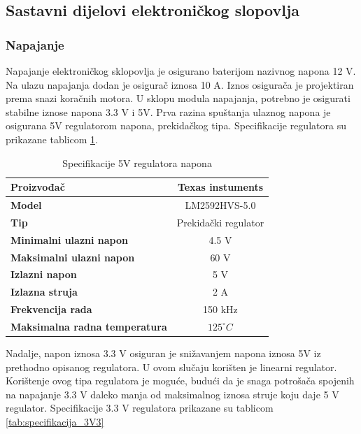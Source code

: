 \documentclass[11pt,a4paper]{article}
\begin{document}
\subsection{Sastavni dijelovi elektroničkog slopovlja}

\subsubsection{Napajanje}
Napajanje elektroničkog sklopovlja je osigurano baterijom nazivnog napona 12 V. Na ulazu napajanja dodan je osigurač iznosa 10 A. Iznos osigurača je projektiran prema snazi koračnih motora. U sklopu modula napajanja, potrebno je osigurati stabilne iznose napona 3.3 V i 5V. Prva razina spuštanja ulaznog napona je osigurana 5V regulatorom napona, prekidačkog tipa. Specifikacije regulatora su prikazane tablicom \ref{tab:specifikacija_5V}.


\begin{table}[H]
	\centering
	\caption{Specifikacije 5V regulatora napona}
	\label{tab:specifikacija_5V}
	\begin{tabular}{|l|c|}
		\hline
		\textbf{Proizvođač} & Texas instuments  \\ \hline 
		\textbf{Model} &  LM2592HVS-5.0  \\ \hline 
		\textbf{Tip} &  Prekidački regulator  \\ \hline 
		\textbf{Minimalni ulazni napon} & 4.5 V \\ \hline 
		\textbf{Maksimalni ulazni napon} & 60 V \\ \hline 
		\textbf{Izlazni napon} & 5 V \\ \hline 
		\textbf{Izlazna struja} & 2 A \\ \hline 
		\textbf{Frekvencija rada} & 150 kHz \\ \hline 
		\textbf{Maksimalna radna temperatura} & $125 ^\circ C$ \\ \hline 
	\end{tabular}
\end{table}

Nadalje, napon iznosa 3.3 V osiguran je snižavanjem napona iznosa 5V iz prethodno opisanog regulatora. U ovom slučaju korišten je linearni regulator. Korištenje ovog tipa regulatora je moguće, budući da je snaga potrošača spojenih na napajanje 3.3 V daleko manja od maksimalnog iznosa struje koju daje 5 V regulator. Specifikacije 3.3 V regulatora prikazane su tablicom \ref{tab:specifikacija_3V3}
\end{document}

